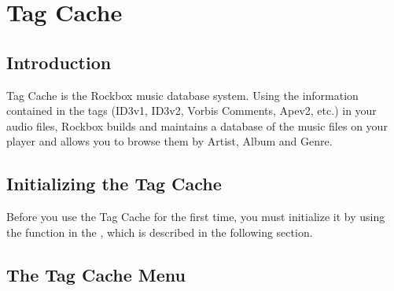 \section{\label{ref:tagcache}Tag Cache} 

\subsection{Introduction}
Tag Cache is the Rockbox music database system. Using the information 
contained in the tags (ID3v1, ID3v2, Vorbis Comments, Apev2, etc.) in your 
audio files, Rockbox builds and maintains a database of the music files on 
your player and allows you to browse them by Artist, Album and Genre.

\subsection{Initializing the Tag Cache}
Before you use the Tag Cache for the first time, you must initialize it by using
the  function in the , which is
described in the following section.

\subsection{\label{ref:tagcachemenu}The Tag Cache Menu}

